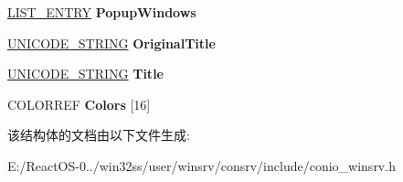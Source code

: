 \begin{DoxyCompactItemize}
\item 
\mbox{\label{struct___w_i_n_s_r_v___c_o_n_s_o_l_e_a9500d27711867570f6278e6a3433acc5}} 
\hyperlink{struct___l_i_s_t___e_n_t_r_y}{L\+I\+S\+T\+\_\+\+E\+N\+T\+RY} {\bfseries Popup\+Windows}
\item 
\mbox{\label{struct___w_i_n_s_r_v___c_o_n_s_o_l_e_a074879a53538600de72c730eed34f54c}} 
\hyperlink{struct___u_n_i_c_o_d_e___s_t_r_i_n_g}{U\+N\+I\+C\+O\+D\+E\+\_\+\+S\+T\+R\+I\+NG} {\bfseries Original\+Title}
\item 
\mbox{\label{struct___w_i_n_s_r_v___c_o_n_s_o_l_e_a97f789bf3766078483e75faf7b6e96e7}} 
\hyperlink{struct___u_n_i_c_o_d_e___s_t_r_i_n_g}{U\+N\+I\+C\+O\+D\+E\+\_\+\+S\+T\+R\+I\+NG} {\bfseries Title}
\item 
\mbox{\label{struct___w_i_n_s_r_v___c_o_n_s_o_l_e_a52ce1e25ec8030fbd3934d549324937c}} 
C\+O\+L\+O\+R\+R\+EF {\bfseries Colors} \mbox{[}16\mbox{]}
\end{DoxyCompactItemize}


该结构体的文档由以下文件生成\+:\begin{DoxyCompactItemize}
\item 
E\+:/\+React\+O\+S-\/0../win32ss/user/winsrv/consrv/include/conio\+\_\+winsrv.\+h\end{DoxyCompactItemize}
